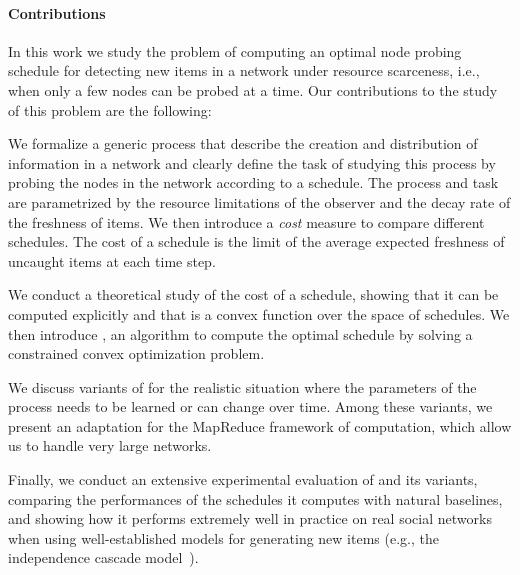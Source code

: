 
\paragraph*{Contributions}
In this work we study the problem of computing an optimal node probing schedule
for detecting new items in a network under resource scarceness, i.e., when only
a few nodes can be probed at a time. Our contributions to the study of this
problem are the following:

\begin{itemize*}
	\item We formalize a generic process that describe the creation and
		distribution of information in a network and clearly define the task of
		studying this process by probing the nodes in the network according to a
		schedule. The process and task are parametrized by the resource
		limitations of the observer and the decay rate of the freshness of
		items. We then introduce a \emph{cost} measure to compare different
		schedules. The cost of a schedule is the limit of the average expected
		freshness of uncaught items at each time step.
	\item We conduct a theoretical study of the cost of a schedule, showing that
		it can be computed explicitly and that is a convex function over the
		space of schedules. We then introduce \algoname, an algorithm to compute
		the optimal schedule by solving a constrained convex optimization
		problem.
	\item We discuss variants of \algoname for the realistic situation where
		the parameters of the process needs to be learned or can change over
		time. Among these variants, we present an adaptation for the MapReduce
		framework of computation, which allow us to handle very large networks.
	\item Finally, we conduct an extensive experimental evaluation of \algoname
		and its variants, comparing the performances of the schedules it
		computes with natural baselines, and showing how it performs extremely
		well in practice on real social networks when using well-established
		models for generating new items (e.g., the independence cascade
		model~\citemissing).
\end{itemize*}

